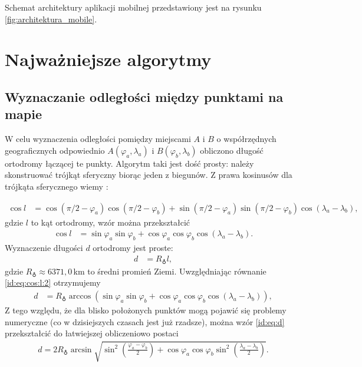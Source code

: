 \documentclass[a4paper]{book}
\begin{document}
			Schemat architektury aplikacji mobilnej przedstawiony jest na rysunku \ref{fig:architektura_mobile}. 
			
		\section{Najważniejsze algorytmy}
			
			\subsection{Wyznaczanie odległości między punktami na mapie}
				
			W celu wyznaczenia odległości pomiędzy miejscami $A$ i $B$ o współrzędnych geograficznych odpowiednio $A(\varphi_a, \lambda_a)$ i $B(\varphi_b, \lambda_b)$ obliczono długość ortodromy łączącej te punkty. Algorytm taki jest dość prosty: należy skonstruować 
			trójkąt sferyczny biorąc jeden z biegunów. Z prawa kosinusów dla trójkąta sferycznego wiemy \cite{id:Mietelski1989Atronomia}:		
		
			\begin{align}
			\cos l & = \cos (\pi/2 - \varphi_a) \cos (\pi/2 - \varphi_b) + \sin (\pi/2 - \varphi_a) \sin (\pi/2 - \varphi_b) \cos (\lambda_a - \lambda_b),
			\end{align}
			gdzie $l$ to kąt ortodromy, wzór można przekształcić
			\begin{align}
			\cos l & = \sin\varphi_a \sin \varphi_b + \cos\varphi_a \cos\varphi_b \cos (\lambda_a - \lambda_b).\label{id:eq:cos:l:2}						
			\end{align}
			Wyznaczenie długości $d$ ortodromy jest proste:
			\begin{align}
			d & =   R_{\earth} l,
			\end{align}
			gdzie $R_{\earth} \approx 6371{,}0\,$km to średni promień Ziemi.
			Uwzględniając równanie \eqref{id:eq:cos:l:2} otrzymujemy
			\begin{align}
		    d & =   R_{\earth} \arccos \left( \sin\varphi_a \sin \varphi_b + \cos\varphi_a \cos\varphi_b \cos (\lambda_a - \lambda_b) \right),\label{id:eq:d}
			\end{align}
			Z tego względu, że dla blisko położonych punktów mogą pojawić się problemy numeryczne (co w dzisiejszych czasach jest już rzadsze), można wzór \eqref{id:eq:d} przekształcić do łatwiejszej obliczeniowo postaci
			\begin{align}
            d = 2R_{\earth} \arcsin\sqrt{\sin^{2}\left(\frac{\varphi_a - \varphi_b}{2}\right) + \cos\varphi_a\cos\varphi_b\sin^{2}\left(\frac{\lambda_a - \lambda_b}{2}\right) }.
			\end{align}
						
\end{document}
